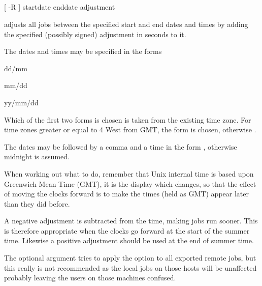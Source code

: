 \subsection{\BtdstName}

\begin{expara}

\BtdstName{} [ -R ] startdate enddate adjustment

\end{expara}

\PrBtdst{} adjusts all jobs between the specified start and end dates and times by adding the specified (possibly signed)
adjustment in seconds to it.

The dates and times may be specified in the forms

\begin{expara}

dd/mm

mm/dd

yy/mm/dd

\end{expara}

Which of the first two forms is chosen is taken from the existing time zone. For time zones greater or equal to 4 West from GMT, the
 form is chosen, otherwise .

The dates may be followed by a comma and a time in the form , otherwise midnight is assumed.

When working out what to do, remember that Unix internal time is based upon Greenwich Mean Time (GMT), it is the display which changes, so
that the effect of moving the clocks forward is to make the times (held as GMT) appear later than they did before.

A negative adjustment is subtracted from the time, making jobs run sooner. This is therefore appropriate when the clocks go forward at the
start of the summer time. Likewise a positive adjustment should be used at the end of summer time.

The optional argument  tries to apply the option to all exported remote jobs, but this really is not recommended
as the local jobs on those hosts will be unaffected probably leaving the users on those machines confused.

